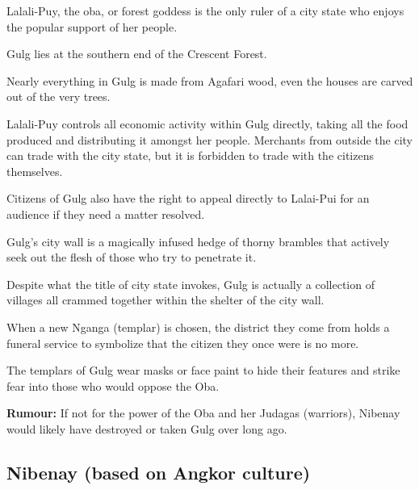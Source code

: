 \begin{multicols}{2}
\begin{description}
    \item Lalali-Puy, the oba, or forest goddess is the only ruler of a city state who enjoys the popular support of her people.
    \item Gulg lies at the southern end of the Crescent Forest.
    \item Nearly everything in Gulg is made from Agafari wood, even the houses are carved out of the very trees.
    \item Lalali-Puy controls all economic activity within Gulg directly, taking all the food produced and distributing it amongst her people. Merchants from outside the city can trade with the city state, but it is forbidden to trade with the citizens themselves.
    \item Citizens of Gulg also have the right to appeal directly to Lalai-Pui for an audience if they need a matter resolved.
    \item Gulg’s city wall is a magically infused hedge of thorny brambles that actively seek out the flesh of those who try to penetrate it.
    \item Despite what the title of city state invokes, Gulg is actually a collection of villages all crammed together within the shelter of the city wall.
    \item When a new Nganga (templar) is chosen, the district they come from holds a funeral service to symbolize that the citizen they once were is no more.
    \item The templars of Gulg wear masks or face paint to hide their features and strike fear into those who would oppose the Oba.
    \item \textbf{Rumour:} If not for the power of the Oba and her Judagas (warriors), Nibenay would likely have destroyed or taken Gulg over long ago.
\end{description}

\subsection{Nibenay (based on Angkor culture)}


\end{multicols}
